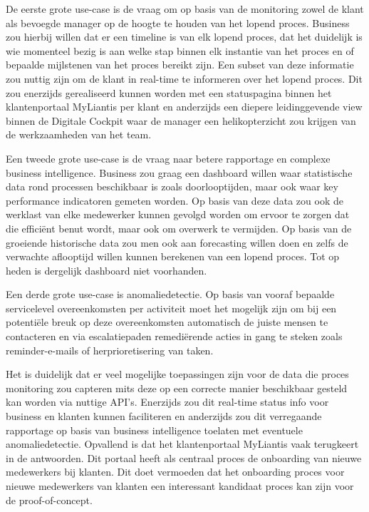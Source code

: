 De eerste grote use-case is de vraag om op basis van de monitoring zowel de klant als bevoegde manager op de hoogte te houden van het lopend proces. Business zou hierbij willen dat er een timeline is van elk lopend proces, dat het duidelijk is wie momenteel bezig is aan welke stap binnen elk instantie van het proces en of bepaalde mijlstenen van het proces bereikt zijn. Een subset van deze informatie zou nuttig zijn om de klant in real-time te informeren over het lopend proces. Dit zou enerzijds gerealiseerd kunnen worden met een statuspagina binnen het klantenportaal MyLiantis per klant en anderzijds een diepere leidinggevende view binnen de Digitale Cockpit waar de manager een helikopterzicht zou krijgen van de werkzaamheden van het team. \newline

Een tweede grote use-case is de vraag naar betere rapportage en complexe business intelligence. Business zou graag een dashboard willen waar statistische data rond processen beschikbaar is zoals doorlooptijden, maar ook waar key performance indicatoren gemeten worden. Op basis van deze data zou ook de werklast van elke medewerker kunnen gevolgd worden om ervoor te zorgen dat die efficiënt benut wordt, maar ook om overwerk te vermijden. Op basis van de groeiende historische data zou men ook aan forecasting willen doen en zelfs de verwachte aflooptijd willen kunnen berekenen van een lopend proces. Tot op heden is dergelijk dashboard niet voorhanden. \newline

Een derde grote use-case is anomaliedetectie. Op basis van vooraf bepaalde servicelevel overeenkomsten per activiteit moet het mogelijk zijn om bij een potentiële breuk op deze overeenkomsten automatisch de juiste mensen te contacteren en via escalatiepaden remediërende acties in gang te steken zoals reminder-e-mails of herprioretisering van taken.\newline

Het is duidelijk dat er veel mogelijke toepassingen zijn voor de data die proces monitoring zou capteren mits deze op een correcte manier beschikbaar gesteld kan worden via nuttige API’s. Enerzijds zou dit real-time status info voor business en klanten kunnen faciliteren en anderzijds zou dit verregaande rapportage op basis van business intelligence toelaten met eventuele anomaliedetectie. Opvallend is dat het klantenportaal MyLiantis vaak terugkeert in de antwoorden. Dit portaal heeft als centraal proces de onboarding van nieuwe medewerkers bij klanten. Dit doet vermoeden dat het onboarding proces voor nieuwe medewerkers van klanten een interessant kandidaat proces kan zijn voor de proof-of-concept.

